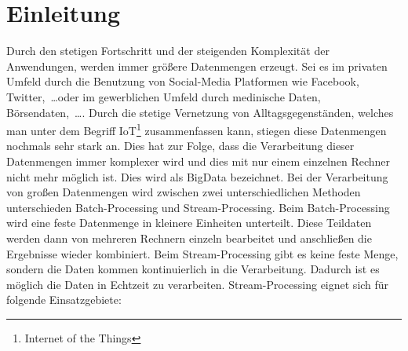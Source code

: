 \chapter{Einleitung}
Durch den stetigen Fortschritt und der steigenden Komplexität der Anwendungen,
werden immer größere Datenmengen erzeugt. Sei es im privaten Umfeld durch die
Benutzung von Social-Media Platformen wie Facebook, Twitter,~\dots oder im gewerblichen
Umfeld durch medinische Daten, Börsendaten,~\dots . Durch die stetige Vernetzung
von Alltagsgegenständen, welches man unter dem Begriff IoT\footnote{Internet of the Things}
zusammenfassen kann, stiegen diese Datenmengen nochmals sehr stark an. Dies hat
zur Folge, dass die Verarbeitung dieser Datenmengen immer komplexer wird und dies
mit nur einem einzelnen Rechner nicht mehr möglich ist. Dies wird als \gls{BigData}
bezeichnet. Bei der Verarbeitung von großen Datenmengen wird zwischen zwei
unterschiedlichen Methoden unterschieden Batch-Processing und Stream-Processing.
Beim Batch-Processing wird eine feste Datenmenge in kleinere Einheiten unterteilt.
Diese Teildaten werden dann von mehreren Rechnern einzeln bearbeitet und
anschließen die Ergebnisse wieder kombiniert. Beim Stream-Processing gibt es
keine feste Menge, sondern die Daten kommen kontinuierlich in die Verarbeitung.
Dadurch ist es möglich die Daten in Echtzeit zu verarbeiten. Stream-Processing
eignet sich für folgende Einsatzgebiete:

